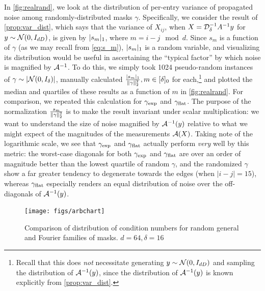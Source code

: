In \cref{fig:realrand}, we look at the distribution of per-entry variance of propagated noise among randomly-distributed masks $\gamma$.  Specifically, we consider the result of \cref{prop:var_dist}, which says that the variance of $X_{ij}$, when $X = \Dc_\delta^{-1} A^{-1} y$ for $y \sim \Nc(0, I_{d D})$, is given by $\abs{s_m}_1$, where $m = i - j \mod d$.  Since $s_m$ is a function of $\gamma$ (as we may recall from \eqref{eq:s_m}), $\abs{s_m}_1$ is a random variable, and visualizing its distribution would be useful in ascertaining the ``typical factor'' by which noise is magnified by $\Ac^{-1}$.  To do this, we simply took 1024 pseudo-random instances of $\gamma \sim \abs*{\Nc(0, I_{\delta})}$, manually calculated $\frac{\abs{s_m}_1}{\norm{\gamma}_2^2}, m \in [\delta]_0$ for each,\footnote{Recall that this does \emph{not} necessitate generating $y \sim \Nc(0, I_{d D})$ and sampling the distribution of $\Ac^{-1}(y)$, since the distribution of $\Ac^{-1}(y)$ is known explicitly from \cref{prop:var_dist}.} and plotted the median and quartiles of these results as a function of $m$ in \cref{fig:realrand}.  For comparison, we repeated this calculation for $\gamma_{\rm exp}$ and $\gamma_{\rm flat}$.  The purpose of the normalization $\frac{s_m}{\norm{\gamma}_2^2}$ is to make the result invariant under scalar multiplication: we want to understand the size of noise magnified by $\Ac^{-1}(y)$ relative to what we might expect of the magnitudes of the measurements $\Ac(X)$.  Taking note of the logarithmic scale, we see that $\gamma_{\rm exp}$ and $\gamma_{\rm flat}$ actually perform \emph{very} well by this metric: the worst-case diagonals for both $\gamma_{\rm exp}$ and $\gamma_{\rm flat}$ are over an order of magnitude better than the lowest quartile of random $\gamma$, and the randomized $\gamma$ show a far greater tendency to degenerate towards the edges (when $|i - j| = 15$), whereas $\gamma_{\rm flat}$ especially renders an equal distribution of noise over the off-diagonals of $\Ac^{-1}(y)$.

\begin{figure}
  \centering
  \texttt{[image: figs/arbchart]}
  \caption{Comparison of distribution of condition numbers for random general and Fourier families of masks.  $d = 64, \delta = 16$}
  \label{fig:arbchart}
\end{figure}

